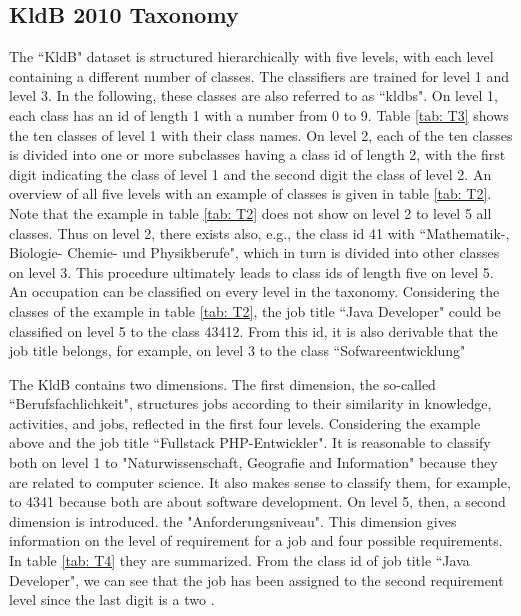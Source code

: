 \documentclass[12pt, a4paper, titlepage]{article}
\begin{document}
\subsection{KldB 2010 Taxonomy}
The ``\ac{KldB}" dataset is structured hierarchically with five levels, with each level containing a different number of classes. The classifiers are trained for level 1 and level 3. In the following, these classes are also referred to as ``kldbs". On level 1, each class has an id of length 1 with a number from 0 to 9. Table \ref{tab: T3} shows the ten classes of level 1 with their class names. On level 2, each of the ten classes is divided into one or more subclasses having a class id of length 2, with the first digit indicating the class of level 1 and the second digit the class of level 2. An overview of all five levels with an example of classes is given in table \ref{tab: T2}. Note that the example in table \ref{tab: T2} does not show on level 2 to level 5 all classes. Thus on level 2, there exists also, e.g., the class id 41 with ``Mathematik-, Biologie- Chemie- und Physikberufe", which in turn is divided into other classes on level 3. This procedure ultimately leads to class ids of length five on level 5. An occupation can be classified on every level in the taxonomy. Considering the classes of the example in table \ref{tab: T2}, the job title ``Java Developer" could be classified on level 5 to the class 43412. From this id, it is also derivable that the job title belongs, for example, on level 3 to the class ``Sofwareentwicklung" \citep{Bundesagentur2011a, Bundesagentur2011b, Paulus2013}

The \ac{KldB} contains two dimensions. The first dimension, the so-called ``Berufsfachlichkeit", structures jobs according to their similarity in knowledge, activities, and jobs, reflected in the first four levels. Considering the example above and the job title ``Fullstack PHP-Entwickler". It is reasonable to classify both on level 1 to "Naturwissenschaft, Geografie and Information" because they are related to computer science. It also makes sense to classify them, for example, to 4341 because both are about software development. On level 5, then, a second dimension is introduced. the "Anforderungsniveau". This dimension gives information on the level of requirement for a job and four possible requirements. In table \ref{tab: T4} they are summarized. From the class id of job title ``Java Developer", we can see that the job has been assigned to the second requirement level since the last digit is a two \citep{Bundesagentur2011a, Bundesagentur2011b, Paulus2013}. 
\end{document}
